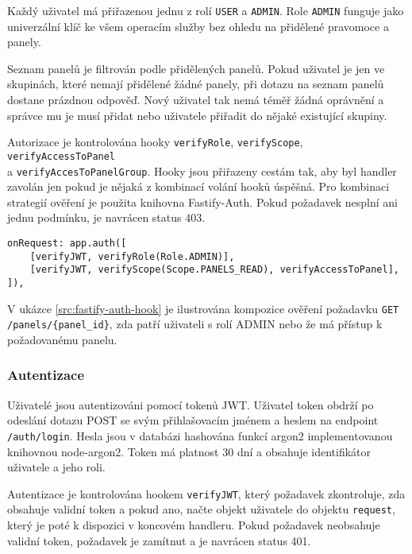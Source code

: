 Každý uživatel má přiřazenou jednu z rolí \lstinline|USER| a \lstinline|ADMIN|. Role \lstinline|ADMIN| funguje jako univerzální klíč ke všem operacím služby bez ohledu na přidělené pravomoce a panely.

Seznam panelů je filtrován podle přidělených panelů. Pokud uživatel je jen ve skupinách, které nemají přidělené žádné panely, při dotazu na seznam panelů dostane prázdnou odpověď. Nový uživatel tak nemá téměř žádná oprávnění a správce mu je musí přidat nebo uživatele přiřadit do nějaké existující skupiny.

Autorizace je kontrolována hooky \lstinline|verifyRole|, \lstinline|verifyScope|, \lstinline|verifyAccessToPanel| \\a \lstinline|verifyAccesToPanelGroup|. Hooky jsou přiřazeny cestám tak, aby byl handler zavolán jen pokud je nějaká z kombinací volání hooků úspěšná. Pro kombinaci strategií ověření je použita knihovna Fastify-Auth\cite{FastifyFastifyauth2024}. Pokud požadavek nesplní ani jednu podmínku, je navrácen status 403. 

\begin{lstlisting}[label=src:fastify-auth-hook,caption={Kompozice hooků ověřeujících autorizaci požadavků}]
onRequest: app.auth([
    [verifyJWT, verifyRole(Role.ADMIN)],
    [verifyJWT, verifyScope(Scope.PANELS_READ), verifyAccessToPanel],
]),
\end{lstlisting}

V ukázce \ref{src:fastify-auth-hook} je ilustrována kompozice ověření požadavku \lstinline|GET /panels/{panel_id}|, zda patří uživateli s rolí ADMIN nebo že má přístup k požadovanému panelu.

\subsubsection{Autentizace}
Uživatelé jsou autentizováni pomocí tokenů JWT. Uživatel token obdrží po odeslání dotazu POST se svým přihlašovacím jménem a heslem na endpoint \lstinline|/auth/login|. Hesla jsou v databázi hashována funkcí argon2 implementovanou knihovnou node-argon2\cite{althoffRanisaltNodeargon22024}. Token má platnost 30 dní a obsahuje identifikátor uživatele a jeho roli.

Autentizace je kontrolována hookem \lstinline|verifyJWT|, který požadavek zkontroluje, zda obsahuje validní token a pokud ano, načte objekt uživatele do objektu \lstinline|request|, který je poté k dispozici v koncovém handleru. Pokud požadavek neobsahuje validní token, požadavek je zamítnut a je navrácen status 401.

